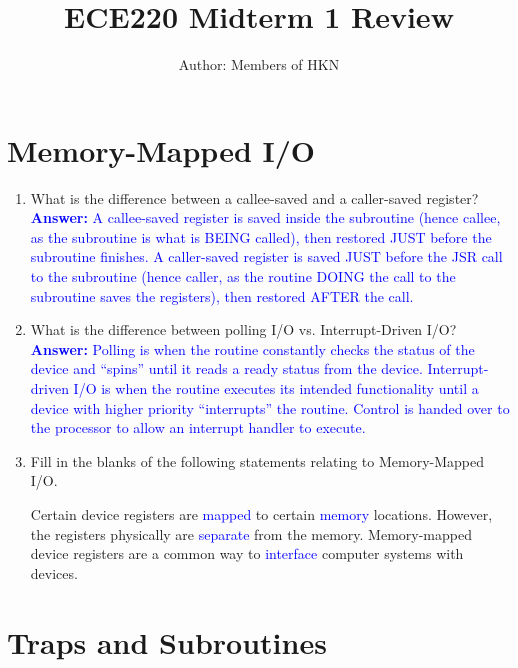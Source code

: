 \documentclass{article}
\title{ECE220 Midterm 1 Review}
\author{Author: Members of HKN}
\date{}
\begin{document}
\maketitle

\section {
Memory-Mapped I/O
}


\begin{enumerate}[label=(\alph*)]
    \item What is the difference between a callee-saved and a caller-saved register?
    \newline
    \textcolor{blue}{\textbf{Answer:} A callee-saved register is saved inside the subroutine (hence callee, as the subroutine is what is BEING called), then restored JUST before the subroutine finishes. A caller-saved register is saved JUST before the JSR call to the subroutine (hence caller, as the routine DOING the call to the subroutine saves the registers), then restored AFTER the call. }
   

    \item What is the difference between polling I/O vs. Interrupt-Driven I/O?
    \newline
    \textcolor{blue}{\textbf{Answer:} Polling is when the routine constantly checks the status of the device and “spins” until it reads a ready status from the device. Interrupt-driven I/O is when the routine executes its intended functionality until a device with higher priority “interrupts” the routine. Control is handed over to the processor to allow an interrupt handler to execute.}

    \item Fill in the blanks of the following statements relating to Memory-Mapped I/O.

    Certain device registers are \textcolor{blue}{mapped} to certain \textcolor{blue}{memory} locations. However, the registers physically are \textcolor{blue}{separate} from the memory. Memory-mapped device registers are a common way to \textcolor{blue}{interface} computer systems with devices.

    

    
\end{enumerate}


\section{
    Traps and Subroutines
}
\end{document}
